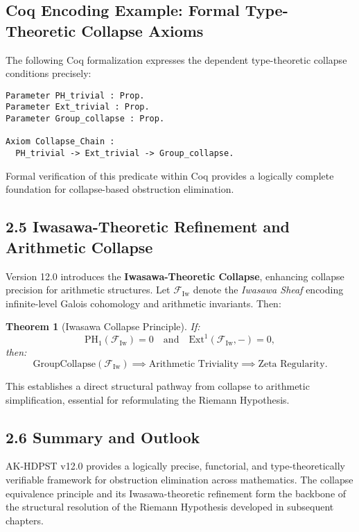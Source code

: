 \documentclass[11pt]{article}
\newtheorem{theorem}{Theorem}[section]
\begin{document}
\subsection*{Coq Encoding Example: Formal Type-Theoretic Collapse Axioms}

The following Coq formalization expresses the dependent type-theoretic collapse conditions precisely:

\begin{lstlisting}[language=Coq, caption=Formal Type-Theoretic Collapse Axioms, captionpos=b]
Parameter PH_trivial : Prop.
Parameter Ext_trivial : Prop.
Parameter Group_collapse : Prop.

Axiom Collapse_Chain :
  PH_trivial -> Ext_trivial -> Group_collapse.
\end{lstlisting}


Formal verification of this predicate within Coq provides a logically complete foundation for collapse-based obstruction elimination.

\subsection*{2.5 Iwasawa-Theoretic Refinement and Arithmetic Collapse}

Version 12.0 introduces the \textbf{Iwasawa-Theoretic Collapse}, enhancing collapse precision for arithmetic structures. Let $\mathcal{F}_{\mathrm{Iw}}$ denote the \textit{Iwasawa Sheaf} encoding infinite-level Galois cohomology and arithmetic invariants. Then:

\begin{theorem}[Iwasawa Collapse Principle]
If:
\[
\mathrm{PH}_1(\mathcal{F}_{\mathrm{Iw}}) = 0 \quad \text{and} \quad \mathrm{Ext}^1(\mathcal{F}_{\mathrm{Iw}}, -) = 0,
\]
then:
\[
\mathrm{GroupCollapse}(\mathcal{F}_{\mathrm{Iw}}) \implies \text{Arithmetic Triviality} \implies \text{Zeta Regularity}.
\]
\end{theorem}

This establishes a direct structural pathway from collapse to arithmetic simplification, essential for reformulating the Riemann Hypothesis.

\subsection*{2.6 Summary and Outlook}

AK-HDPST v12.0 provides a logically precise, functorial, and type-theoretically verifiable framework for obstruction elimination across mathematics. The collapse equivalence principle and its Iwasawa-theoretic refinement form the backbone of the structural resolution of the Riemann Hypothesis developed in subsequent chapters.
\end{document}
